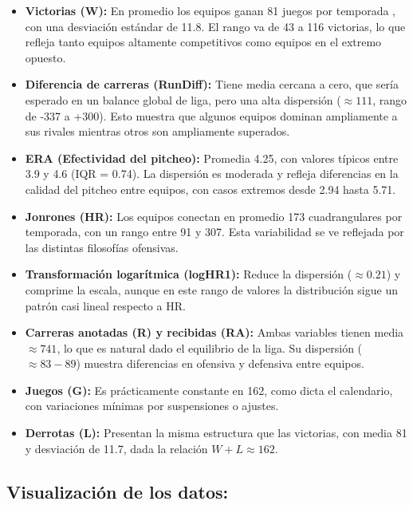 \documentclass[man,floatsintext]{apa7}
\begin{document}
\begin{itemize}
    \item \textbf{Victorias (W):} En promedio los equipos ganan 81 juegos por temporada , con una desviación estándar de 11.8. El rango va de 43 a 116 victorias, lo que refleja tanto equipos altamente competitivos como equipos en el extremo opuesto.
    \item \textbf{Diferencia de carreras (RunDiff):} Tiene media cercana a cero, que sería esperado en un balance global de liga, pero una alta dispersión ($\approx 111$, rango de -337 a +300). Esto muestra que algunos equipos dominan ampliamente a sus rivales mientras otros son ampliamente superados.
    \item \textbf{ERA (Efectividad del pitcheo):} Promedia 4.25, con valores típicos entre 3.9 y 4.6 (IQR = 0.74). La dispersión es moderada y refleja diferencias en la calidad del pitcheo entre equipos, con casos extremos desde 2.94 hasta 5.71.
    \item \textbf{Jonrones (HR):} Los equipos conectan en promedio 173 cuadrangulares por temporada, con un rango entre 91 y 307. Esta variabilidad se ve reflejada por las distintas filosofías ofensivas.
    \item \textbf{Transformación logarítmica (logHR1):} Reduce la dispersión ($\approx 0.21$) y comprime la escala, aunque en este rango de valores la distribución sigue un patrón casi lineal respecto a HR.
    \item \textbf{Carreras anotadas (R) y recibidas (RA):} Ambas variables tienen media $\approx 741$, lo que es natural dado el equilibrio de la liga. Su dispersión ($\approx 83-89$) muestra diferencias en ofensiva y defensiva entre equipos.
    \item \textbf{Juegos (G):} Es prácticamente constante en 162, como dicta el calendario, con variaciones mínimas por suspensiones o ajustes.
    \item \textbf{Derrotas (L):} Presentan la misma estructura que las victorias, con media 81 y desviación de 11.7, dada la relación \(W+L \approx 162\).
\end{itemize}
\subsection{Visualización de los datos:}
\end{document}
